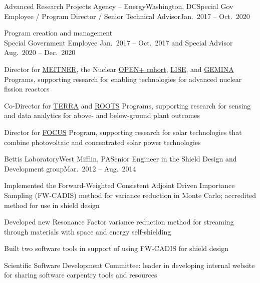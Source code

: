 \begin{rSubsection}{Advanced Research Projects Agency -- Energy}{Washington,
DC}{Special Gov Employee / Program Director / Senior Technical Advisor}{Jan.\
2017 -- Oct.\ 2020}
\item Program creation and management\\
Special Government Employee Jan.\ 2017 --
Oct.\ 2017 and Special Advisor Aug.\ 2020 -- Dec.\ 2020
\item Director for
\href{https://arpa-e.energy.gov/?q=arpa-e-programs/meitner}{MEITNER}, the
Nuclear
\href{https://arpa-e.energy.gov/?q=news-item/arpa-e-announces-12-million-five-projects-nuclear-materials-science}{OPEN+
cohort},
\href{https://arpa-e.energy.gov/?q=news-item/arpa-e-innovating-through-unconventional-ideas}{LISE}, and  \href{https://arpa-e.energy.gov/?q=workshop/optimal-operations-advanced-nuclear-reactors}{GEMINA} Programs, supporting research for enabling technologies for advanced nuclear fission reactors
\item Co-Director for \href{https://arpa-e.energy.gov/?q=arpa-e-programs/terra}{TERRA} and \href{https://arpa-e.energy.gov/?q=arpa-e-programs/roots}{ROOTS} Programs, supporting research for sensing and data analytics for above- and below-ground plant outcomes
\item Director for \href{https://arpa-e.energy.gov/?q=arpa-e-programs/focus}{FOCUS} Program, supporting research for solar technologies that combine photovoltaic and concentrated solar power technologies
\end{rSubsection}



\begin{rSubsection}{Bettis Laboratory}{West Mifflin, PA}{Senior Engineer in the Shield Design and Development group}{Mar.\ 2012 -- Aug.\ 2014}
\item Implemented the Forward-Weighted Consistent Adjoint Driven Importance Sampling (FW-CADIS) method for variance reduction in Monte Carlo; accredited method for use in shield design
\item Developed new Resonance Factor variance reduction method for streaming through materials with space and energy self-shielding
\item Built two software tools in support of using FW-CADIS for shield design
\item Scientific Software Development Committee: leader in developing internal website for sharing software carpentry tools and resources
\end{rSubsection}

